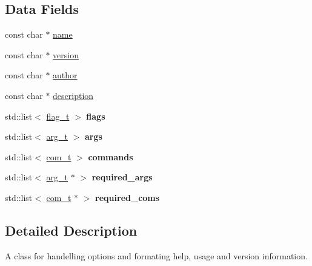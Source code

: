 \subsection*{Data Fields}
\begin{DoxyCompactItemize}
\item 
const char $\ast$ \hyperlink{classenv__t_a8a4fdbcdf5773e33d4a1553bc621e1b4}{name}
\item 
const char $\ast$ \hyperlink{classenv__t_a837e459f0e0d418a976ed4e8fa6acd39}{version}
\item 
const char $\ast$ \hyperlink{classenv__t_a93b99498ee34c3e607bf2757b13443dc}{author}
\item 
const char $\ast$ \hyperlink{classenv__t_ae3578fa78fcac7714be35958427095c2}{description}
\item 
\hypertarget{classenv__t_a0b17ee1539e7a27fe0e5efb1ddf13af0}{std\-::list$<$ \hyperlink{classflag__t}{flag\-\_\-t} $>$ {\bfseries flags}}\label{classenv__t_a0b17ee1539e7a27fe0e5efb1ddf13af0}

\item 
\hypertarget{classenv__t_ae74e249d826b986f6af2f5450cd246df}{std\-::list$<$ \hyperlink{classarg__t}{arg\-\_\-t} $>$ {\bfseries args}}\label{classenv__t_ae74e249d826b986f6af2f5450cd246df}

\item 
\hypertarget{classenv__t_a26bd9c2ce445926975e57dbe831f4a39}{std\-::list$<$ \hyperlink{classcom__t}{com\-\_\-t} $>$ {\bfseries commands}}\label{classenv__t_a26bd9c2ce445926975e57dbe831f4a39}

\item 
\hypertarget{classenv__t_aa756e347b263bb995d2e1b469cccf4cd}{std\-::list$<$ \hyperlink{classarg__t}{arg\-\_\-t} $\ast$ $>$ {\bfseries required\-\_\-args}}\label{classenv__t_aa756e347b263bb995d2e1b469cccf4cd}

\item 
\hypertarget{classenv__t_a933addf499dd49e5ee6883c4960e1a44}{std\-::list$<$ \hyperlink{classcom__t}{com\-\_\-t} $\ast$ $>$ {\bfseries required\-\_\-coms}}\label{classenv__t_a933addf499dd49e5ee6883c4960e1a44}

\end{DoxyCompactItemize}


\subsection{Detailed Description}
A class for handelling options and formating help, usage and version information. 


